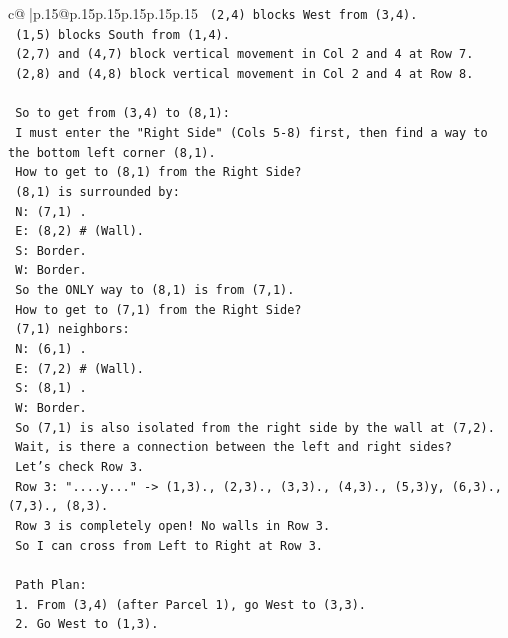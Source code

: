 \documentclass{article}
\begin{document}
{\begin{supertabular}{c@{$\;$}|p{.15\linewidth}@{}p{.15\linewidth}p{.15\linewidth}p{.15\linewidth}p{.15\linewidth}p{.15\linewidth}}
{{{\texttt{   (2,4) blocks West from (3,4).} \\
\texttt{   (1,5) blocks South from (1,4).} \\
\texttt{   (2,7) and (4,7) block vertical movement in Col 2 and 4 at Row 7.} \\
\texttt{   (2,8) and (4,8) block vertical movement in Col 2 and 4 at Row 8.} \\
\\ 
\texttt{   So to get from (3,4) to (8,1):} \\
\texttt{   I must enter the "Right Side" (Cols 5{-}8) first, then find a way to the bottom left corner (8,1).} \\
\texttt{   How to get to (8,1) from the Right Side?} \\
\texttt{   (8,1) is surrounded by:} \\
\texttt{   N: (7,1) .} \\
\texttt{   E: (8,2) \# (Wall).} \\
\texttt{   S: Border.} \\
\texttt{   W: Border.} \\
\texttt{   So the ONLY way to (8,1) is from (7,1).} \\
\texttt{   How to get to (7,1) from the Right Side?} \\
\texttt{   (7,1) neighbors:} \\
\texttt{   N: (6,1) .} \\
\texttt{   E: (7,2) \# (Wall).} \\
\texttt{   S: (8,1) .} \\
\texttt{   W: Border.} \\
\texttt{   So (7,1) is also isolated from the right side by the wall at (7,2).} \\
\texttt{   Wait, is there a connection between the left and right sides?} \\
\texttt{   Let's check Row 3.} \\
\texttt{   Row 3: "....y..." {-}> (1,3)., (2,3)., (3,3)., (4,3)., (5,3)y, (6,3)., (7,3)., (8,3).} \\
\texttt{   Row 3 is completely open! No walls in Row 3.} \\
\texttt{   So I can cross from Left to Right at Row 3.} \\
\\ 
\texttt{   Path Plan:} \\
\texttt{   1. From (3,4) (after Parcel 1), go West to (3,3).} \\
\texttt{   2. Go West to (1,3).} \\
}}}
\end{supertabular}}
\end{document}
